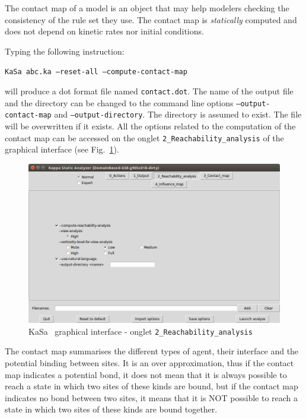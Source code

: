 \documentclass[11pt]{book}
\def\KaSa{\textsf{KaSa}}
\begin{document}
The contact map of a model is an object that may help modelers checking the consistency of the rule set they use. The contact map is \emph{statically} computed and does not depend on kinetic rates nor initial conditions.


Typing the following instruction:

\texttt{KaSa abc.ka --reset-all --compute-contact-map}

will produce a dot format file named \texttt{contact.dot}. 
The name of the output file and the directory can be changed to the command line options \texttt{--output-contact-map} and \texttt{--output-directory}. 
The directory is assumed to exist. The file will be overwritten if it exists. All the options related to the computation of the contact map can be accessed on the 
onglet \texttt{2\_Reachability\_analysis} of the graphical interface (see Fig.~\ref{fig:kasa:2}). 

\begin{figure}[htbp]
\centering
\includegraphics[width=12cm,natwidth=920pt,natheight=582pt]{img/kasa_2.png}
\caption{\KaSa~ graphical interface - onglet \texttt{2\_Reachability\_analysis}}
\label{fig:kasa:2}
\end{figure}


The contact map summarises the different types of agent, their interface and the potential binding between sites. It is an over approximation, thus if the contact map indicates a potential bond, it does not mean that it is always possible to reach a state in which two sites of these kinds are bound, but if the contact map indicates no bond between two sites, it means that it is NOT possible to reach a state in which two sites of these kinds are bound together.  
\end{document}
